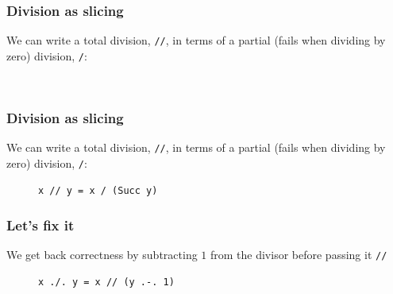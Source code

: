 \documentclass{beamer}
\begin{document}
  \begin{frame}[fragile]
    \frametitle{Division as slicing}
    We can write a total division, \texttt{//}, in terms of a partial (fails when dividing by zero)
    division, \texttt{/}:
    \begin{figure}
    {\color{dark-gray}
      \centering
\begin{BVerbatim}
  
\end{BVerbatim}
    }
    \end{figure}
  \end{frame}
  \begin{frame}[fragile]
    \frametitle{Division as slicing}
    We can write a total division, \texttt{//}, in terms of a partial (fails when dividing by zero)
    division, \texttt{/}:
    \begin{figure}
    {\color{dark-gray}
      \centering
\begin{BVerbatim}
x // y = x / (Succ y)
\end{BVerbatim}
    }
    \end{figure}
  \end{frame}
  \begin{frame}[fragile]
    \frametitle{Let's fix it}
    We get back correctness by subtracting $1$ from the divisor before passing it
    \texttt{//}
    \begin{figure}
    {\color{dark-gray}
      \centering
\begin{BVerbatim}
x ./. y = x // (y .-. 1)
\end{BVerbatim}
    }
    \end{figure}
  \end{frame}
\end{document}
